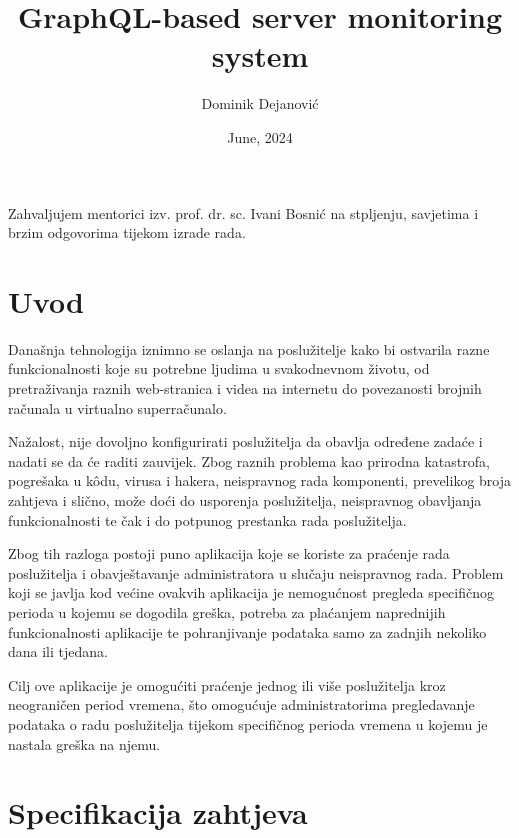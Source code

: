 \documentclass[zavrsnirad]{fer}
\title{GraphQL-based server monitoring system}
\author{Dominik Dejanović}
\date{June, 2024}
\begin{document}

\begin{zahvale}
Zahvaljujem mentorici izv. prof. dr. sc. Ivani Bosnić na stpljenju, savjetima i brzim odgovorima tijekom izrade rada.
\end{zahvale}


\mainmatter


\tableofcontents


\chapter{Uvod}
\label{pog:uvod}
Današnja tehnologija iznimno se oslanja na poslužitelje kako bi ostvarila razne funkcionalnosti koje su potrebne ljudima u svakodnevnom životu, od pretraživanja raznih web-stranica i videa na internetu do povezanosti brojnih računala u virtualno superračunalo. 

Nažalost, nije dovoljno konfigurirati poslužitelja da obavlja određene zadaće i nadati se da će raditi zauvijek. Zbog raznih problema kao prirodna katastrofa, pogrešaka u kôdu, virusa i hakera, neispravnog rada komponenti, prevelikog broja zahtjeva i slično, može doći do usporenja poslužitelja, neispravnog obavljanja funkcionalnosti te čak i do potpunog prestanka rada poslužitelja.

Zbog tih razloga postoji puno aplikacija koje se koriste za praćenje rada poslužitelja i obavještavanje administratora u slučaju neispravnog rada. Problem koji se javlja kod većine ovakvih aplikacija je nemogućnost pregleda specifičnog perioda u kojemu se dogodila greška, potreba za plaćanjem naprednijih funkcionalnosti aplikacije te pohranjivanje podataka samo za zadnjih nekoliko dana ili tjedana.

Cilj ove aplikacije je omogućiti praćenje jednog ili više poslužitelja kroz neograničen period vremena, što omogućuje administratorima pregledavanje podataka o radu poslužitelja tijekom specifičnog perioda vremena u kojemu je nastala greška na njemu.


\chapter{Specifikacija zahtjeva}
\label{pog:specifikacija_zahtjeva}
\end{document}
